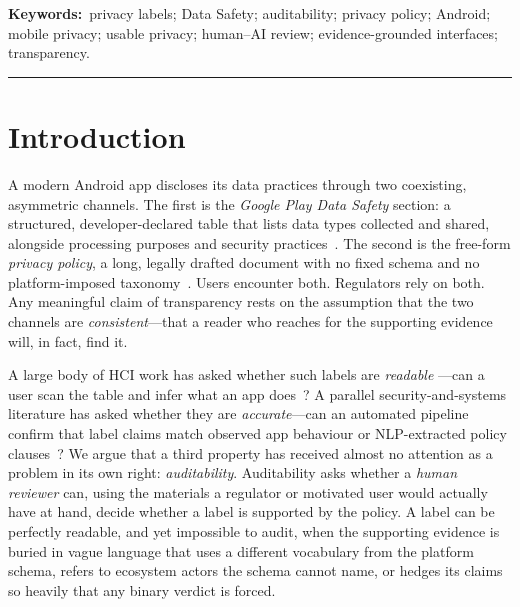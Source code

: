\documentclass[11pt,a4paper]{article}
\begin{document}
\noindent\textbf{Keywords:}\ privacy labels; Data Safety; auditability;
privacy policy; Android; mobile privacy; usable privacy; human--AI review;
evidence-grounded interfaces; transparency.

\bigskip
\hrule
\bigskip

\section{Introduction}
\label{sec:intro}
A modern Android app discloses its data practices through two coexisting,
asymmetric channels. The first is the \emph{Google Play Data Safety} section:
a structured, developer-declared table that lists data types collected and
shared, alongside processing purposes and security
practices~\citep{googledatasafety2022}. The second is the free-form
\emph{privacy policy}, a long, legally drafted document with no fixed schema
and no platform-imposed
taxonomy~\citep{mcdonald2008cost,fabian2017large,jensen2004privacy}. Users
encounter both. Regulators rely on both. Any meaningful claim of transparency
rests on the assumption that the two channels are \emph{consistent}---that a
reader who reaches for the supporting evidence will, in fact, find it.

A large body of HCI work has asked whether such labels are \emph{readable}
---can a user scan the table and infer what an app
does~\citep{kelley2009nutrition,kelley2010standardizing,schaub2015design,
cranor2012necessary}? A parallel security-and-systems literature has asked
whether they are \emph{accurate}---can an automated pipeline confirm that
label claims match observed app behaviour or NLP-extracted policy
clauses~\citep{andow2019policylint,andow2020policheck,zimmeck2019maps,
xiao2023lalaine,khandelwal2024unpacking,harkous2018polisis}? We argue that
a third property has received almost no attention as a problem in its own
right: \emph{auditability}. Auditability asks whether a \emph{human reviewer}
can, using the materials a regulator or motivated user would actually have at
hand, decide whether a label is supported by the policy. A label can be
perfectly readable, and yet impossible to audit, when the supporting evidence
is buried in vague language that uses a different vocabulary from the platform
schema, refers to ecosystem actors the schema cannot name, or hedges its
claims so heavily that any binary verdict is forced.
\end{document}
